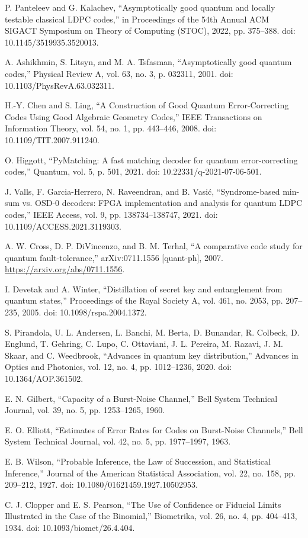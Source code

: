 \documentclass[conference]{IEEEtran}
\begin{document}
\begin{thebibliography}{99}
P. Panteleev and G. Kalachev, ``Asymptotically good quantum and locally testable classical LDPC codes,'' in Proceedings of the 54th Annual ACM SIGACT Symposium on Theory of Computing (STOC), 2022, pp. 375--388. doi: 10.1145/3519935.3520013.

A. Ashikhmin, S. Litsyn, and M. A. Tsfasman, ``Asymptotically good quantum codes,'' Physical Review A, vol. 63, no. 3, p. 032311, 2001. doi: 10.1103/PhysRevA.63.032311.

H.-Y. Chen and S. Ling, ``A Construction of Good Quantum Error-Correcting Codes Using Good Algebraic Geometry Codes,'' IEEE Transactions on Information Theory, vol. 54, no. 1, pp. 443--446, 2008. doi: 10.1109/TIT.2007.911240.

O. Higgott, ``PyMatching: A fast matching decoder for quantum error-correcting codes,'' Quantum, vol. 5, p. 501, 2021. doi: 10.22331/q-2021-07-06-501.

J. Valls, F. Garcia-Herrero, N. Raveendran, and B. Vasić, ``Syndrome-based min-sum vs. OSD-0 decoders: FPGA implementation and analysis for quantum LDPC codes,'' IEEE Access, vol. 9, pp. 138734--138747, 2021. doi: 10.1109/ACCESS.2021.3119303.

A. W. Cross, D. P. DiVincenzo, and B. M. Terhal, ``A comparative code study for quantum fault-tolerance,'' arXiv:0711.1556 [quant-ph], 2007. \url{https://arxiv.org/abs/0711.1556}.

I. Devetak and A. Winter, ``Distillation of secret key and entanglement from quantum states,'' Proceedings of the Royal Society A, vol. 461, no. 2053, pp. 207--235, 2005. doi: 10.1098/rspa.2004.1372.

S. Pirandola, U. L. Andersen, L. Banchi, M. Berta, D. Bunandar, R. Colbeck, D. Englund, T. Gehring, C. Lupo, C. Ottaviani, J. L. Pereira, M. Razavi, J. M. Skaar, and C. Weedbrook, ``Advances in quantum key distribution,'' Advances in Optics and Photonics, vol. 12, no. 4, pp. 1012--1236, 2020. doi: 10.1364/AOP.361502.

E. N. Gilbert, ``Capacity of a Burst-Noise Channel,'' Bell System Technical Journal, vol. 39, no. 5, pp. 1253--1265, 1960.

E. O. Elliott, ``Estimates of Error Rates for Codes on Burst-Noise Channels,'' Bell System Technical Journal, vol. 42, no. 5, pp. 1977--1997, 1963.

E. B. Wilson, ``Probable Inference, the Law of Succession, and Statistical Inference,'' Journal of the American Statistical Association, vol. 22, no. 158, pp. 209--212, 1927. doi: 10.1080/01621459.1927.10502953.

C. J. Clopper and E. S. Pearson, ``The Use of Confidence or Fiducial Limits Illustrated in the Case of the Binomial,'' Biometrika, vol. 26, no. 4, pp. 404--413, 1934. doi: 10.1093/biomet/26.4.404.

\end{thebibliography}
\end{document}
